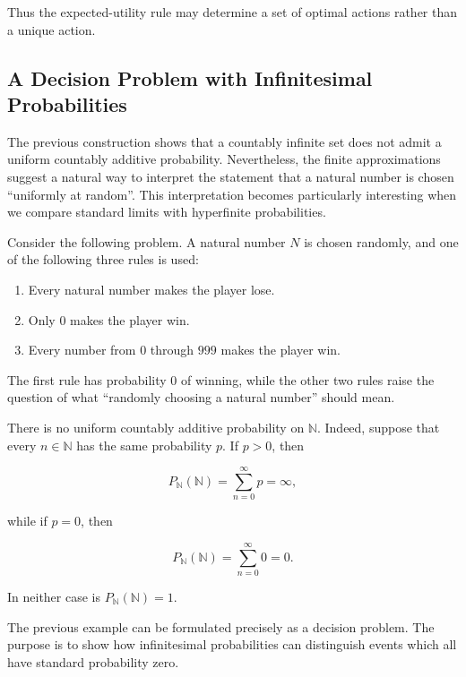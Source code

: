 \documentclass[10pt,a4paper]{book}
\begin{document}
Thus the expected-utility rule may determine a set of optimal actions rather than a unique action.

\subsection{A Decision Problem with Infinitesimal Probabilities}

The previous construction shows that a countably infinite set does not admit a uniform countably additive probability. Nevertheless, the finite approximations suggest a natural way to interpret the statement that a natural number is chosen ``uniformly at random''. This interpretation becomes particularly interesting when we compare standard limits with hyperfinite probabilities.

Consider the following problem. A natural number $N$ is chosen randomly, and one of the following three rules is used:

\begin{enumerate}
    \item Every natural number makes the player lose.
    \item Only $0$ makes the player win.
    \item Every number from $0$ through $999$ makes the player win.
\end{enumerate}

The first rule has probability $0$ of winning, while the other two rules raise the question of what ``randomly choosing a natural number'' should mean.

There is no uniform countably additive probability on $\mathbb N$. Indeed, suppose that every $n\in\mathbb N$ has the same probability $p$. If $p>0$, then

$$
    P_{\mathbb N}(\mathbb N)=\sum_{n=0}^{\infty}p=\infty,
$$

while if $p=0$, then

$$
    P_{\mathbb N}(\mathbb N)=\sum_{n=0}^{\infty}0=0.
$$

In neither case is $P_{\mathbb N}(\mathbb N)=1$.

The previous example can be formulated precisely as a decision problem. The purpose is to show how infinitesimal probabilities can distinguish events which all have standard probability zero.
\end{document}
